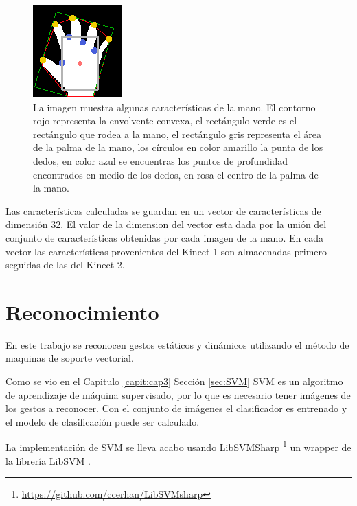 \begin{figure}[h!]
\begin{center} 
\includegraphics[scale=1]{./Figures/250_Dedos.png}
\end{center}
\caption{La imagen muestra algunas características de la mano. El contorno rojo representa la envolvente convexa, el rectángulo verde es el rectángulo que rodea a la mano, el rectángulo gris representa el área de la palma de la mano, los círculos en color amarillo la punta de los dedos, en color azul se encuentras los puntos de profundidad encontrados en medio de los dedos, en rosa el centro de la palma de la mano.}
\label{fig:FeaturesOfHand}
\end{figure}

Las características calculadas se guardan en un vector de características de dimensión $32$. El valor de la dimension del vector esta dada por la unión del conjunto de características obtenidas por cada imagen de la mano. En cada vector las características provenientes del Kinect 1 son almacenadas primero seguidas de las del Kinect 2.





\section{Reconocimiento}\label{sec:ReconocimientoSystem}

En este trabajo se reconocen gestos estáticos y dinámicos utilizando el método de maquinas de soporte vectorial.  

Como se vio en el Capitulo \ref{capit:cap3} Sección \ref{sec:SVM} SVM es un algoritmo de aprendizaje de máquina supervisado, por lo que es necesario tener imágenes de los gestos a reconocer. Con el conjunto de imágenes el clasificador es entrenado y el modelo de clasificación puede ser calculado. 

La implementación de SVM se lleva acabo usando LibSVMSharp \footnote{\url{https://github.com/ccerhan/LibSVMsharp}} un wrapper de la librería LibSVM \citep{Chang2011}.


